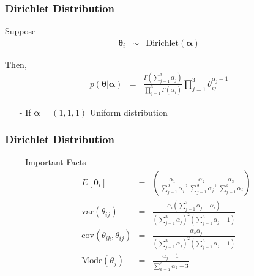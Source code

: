 \documentclass{beamer}
\numberwithin{equation}{section}
\begin{document}
\begin{frame}
\frametitle{Dirichlet Distribution}

Suppose 
\begin{eqnarray}
\boldsymbol{\theta}_{i} & \sim & \text{Dirichlet}(\boldsymbol{\alpha}) \nonumber 
\end{eqnarray}

Then, 
\begin{eqnarray}
p(\boldsymbol{\theta}|\boldsymbol{\alpha}) & = & \frac{\Gamma(\sum_{j=1}^{3} \alpha_{j})}{\prod_{j=1}^{3} \Gamma(\alpha_{j})} \prod_{j=1}^{3}  \theta_{ij}^{\alpha_{j} - 1}  \nonumber 
\end{eqnarray}

\begin{itemize}
\item[-] If $\boldsymbol{\alpha} = (1, 1, 1)$ \alert{Uniform distribution}
\end{itemize}



\end{frame}


\begin{frame}
\frametitle{Dirichlet Distribution}

\begin{itemize}
\item[-] Important Facts
\begin{eqnarray}
E[\boldsymbol{\theta}_{i}] & = &  \left(\frac{\alpha_{1} }{\sum_{j=1}^{3} \alpha_{j} }, \frac{\alpha_{2} }{\sum_{j=1}^{3} \alpha_{j} }, \frac{\alpha_{3} }{\sum_{j=1}^{3} \alpha_{j} }\right) \nonumber \\
\text{var}(\theta_{ij} ) & = & \frac{\alpha_{i}\left(\sum_{j=1}^{3} \alpha_{j} - \alpha_{i} \right)}{\left(\sum_{j=1}^{3} \alpha_{j}\right)^{2} \left(\sum_{j=1}^{3} \alpha_{j} + 1 \right)} \nonumber \\
\text{cov}(\theta_{ik}, \theta_{ij} ) & = & \frac{-\alpha_{k} \alpha_{j} }{ \left(\sum_{j=1}^{3} \alpha_{j}\right)^{2} \left(\sum_{j=1}^{3} \alpha_{j} + 1 \right)  } \nonumber \\
\text{Mode}(\theta_{j}) & = & \frac{\alpha_{j}  - 1}{\sum_{k=1}^{3} \alpha_{k} - 3} \nonumber 
\end{eqnarray}
\end{itemize}

\end{frame}
\end{document}
